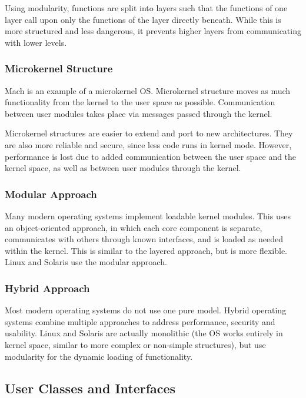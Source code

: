 {Using modularity, functions are split into layers such that the functions of one layer call upon only the functions of the layer directly beneath.
While this is more structured and less dangerous, it prevents higher layers from communicating with lower levels.

\subsubsection{Microkernel Structure}

Mach is an example of a microkernel OS\@.
Microkernel structure moves as much functionality from the kernel to the user space as possible.
Communication between user modules takes place via messages passed through the kernel.

Microkernel structures are easier to extend and port to new architectures.
They are also more reliable and secure, since less code runs in kernel mode.
However, performance is lost due to added communication between the user space and the kernel space, as well as between user modules through the kernel.

\subsubsection{Modular Approach}

Many modern operating systems implement loadable kernel modules.
This uses an object-oriented approach, in which each core component is separate, communicates with others through known interfaces, and is loaded as needed within the kernel.
This is similar to the layered approach, but is more flexible.
Linux and Solaris use the modular approach.

\subsubsection{Hybrid Approach}

Most modern operating systems do not use one pure model.
Hybrid operating systems combine multiple approaches to address performance, security and usability.
Linux and Solaris are actually monolithic (the OS works entirely in kernel space, similar to more complex or non-simple structures), but use modularity for the dynamic loading of functionality.

\subsection{User Classes and Interfaces}

}
